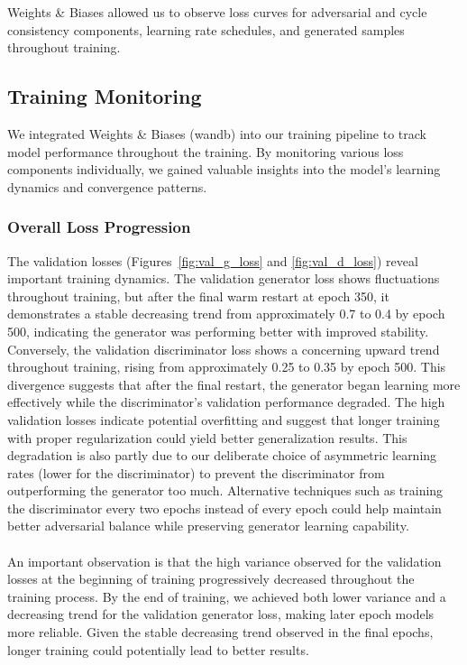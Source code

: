 \documentclass[twocolumn,superscriptaddress,aps]{revtex4-1}
\begin{document}
Weights \& Biases allowed us to observe loss curves for adversarial and cycle consistency components, learning rate schedules, and generated samples throughout training.

\subsection{Training Monitoring}

We integrated Weights \& Biases (wandb) into our training pipeline to track model performance throughout the training. By monitoring various loss components individually, we gained valuable insights into the model's learning dynamics and convergence patterns.

\subsubsection{Overall Loss Progression}

The validation losses (Figures~\ref{fig:val_g_loss} and \ref{fig:val_d_loss}) reveal important training dynamics. The validation generator loss shows fluctuations throughout training, but after the final warm restart at epoch 350, it demonstrates a stable decreasing trend from approximately 0.7 to 0.4 by epoch 500, indicating the generator was performing better with improved stability. Conversely, the validation discriminator loss shows a concerning upward trend throughout training, rising from approximately 0.25 to 0.35 by epoch 500. This divergence suggests that after the final restart, the generator began learning more effectively while the discriminator's validation performance degraded. The high validation losses indicate potential overfitting and suggest that longer training with proper regularization could yield better generalization results. This degradation is also partly due to our deliberate choice of asymmetric learning rates (lower for the discriminator) to prevent the discriminator from outperforming the generator too much. Alternative techniques such as training the discriminator every two epochs instead of every epoch could help maintain better adversarial balance while preserving generator learning capability. \\\\

An important observation is that the high variance observed for the validation losses at the beginning of training progressively decreased throughout the training process. By the end of training, we achieved both lower variance and a decreasing trend for the validation generator loss, making later epoch models more reliable. Given the stable decreasing trend observed in the final epochs, longer training could potentially lead to better results.
\end{document}
